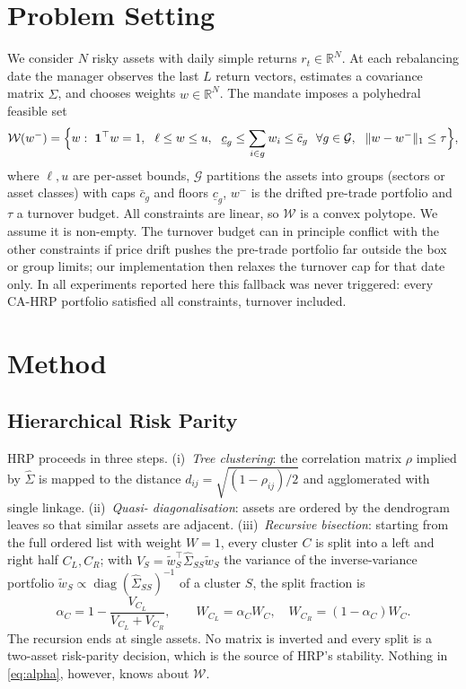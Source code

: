 \section{Problem Setting}\label{sec:setting}

We consider $N$ risky assets with daily simple returns $r_t\in\mathbb{R}^N$. At each
rebalancing date the manager observes the last $L$ return vectors, estimates a covariance
matrix $\hat\Sigma$, and chooses weights $w\in\mathbb{R}^N$. The mandate imposes a
polyhedral feasible set
\begin{equation}\label{eq:feasible}
\mathcal{W}(w^-)=\Bigl\{w:\ \mathbf{1}^\top w=1,\ \ \ell\le w\le u,\ \
\underline{c}_g\le \sum_{i\in g} w_i\le \bar c_g\ \ \forall g\in\mathcal{G},\ \
\lVert w-w^-\rVert_1\le\tau\Bigr\},
\end{equation}
where $\ell,u$ are per-asset bounds, $\mathcal{G}$ partitions the assets into groups
(sectors or asset classes) with caps $\bar c_g$ and floors $\underline{c}_g$, $w^-$ is the
drifted pre-trade portfolio and $\tau$ a turnover budget. All constraints are linear, so
$\mathcal{W}$ is a convex polytope. We assume it is non-empty. The turnover budget can in
principle conflict with the other constraints if price drift pushes the pre-trade
portfolio far outside the box or group limits; our implementation then relaxes the
turnover cap for that date only. In all experiments reported here this fallback was never
triggered: every CA-HRP portfolio satisfied all constraints, turnover included.

\section{Method}\label{sec:method}

\subsection{Hierarchical Risk Parity}
HRP \citep{lopezdeprado2016} proceeds in three steps. (i)~\emph{Tree clustering}: the
correlation matrix $\rho$ implied by $\hat\Sigma$ is mapped to the distance
$d_{ij}=\sqrt{(1-\rho_{ij})/2}$ and agglomerated with single linkage. (ii)~\emph{Quasi-
diagonalisation}: assets are ordered by the dendrogram leaves so that similar assets are
adjacent. (iii)~\emph{Recursive bisection}: starting from the full ordered list with weight
$W=1$, every cluster $C$ is split into a left and right half $C_L,C_R$; with
$V_S=\tilde w_S^\top\hat\Sigma_{SS}\tilde w_S$ the variance of the inverse-variance portfolio
$\tilde w_S\propto\operatorname{diag}(\hat\Sigma_{SS})^{-1}$ of a cluster $S$, the split
fraction is
\begin{equation}\label{eq:alpha}
\alpha_C = 1-\frac{V_{C_L}}{V_{C_L}+V_{C_R}},\qquad
W_{C_L}=\alpha_C W_C,\quad W_{C_R}=(1-\alpha_C)W_C .
\end{equation}
The recursion ends at single assets. No matrix is inverted and every split is a
two-asset risk-parity decision, which is the source of HRP's stability. Nothing in
\eqref{eq:alpha}, however, knows about $\mathcal{W}$.

